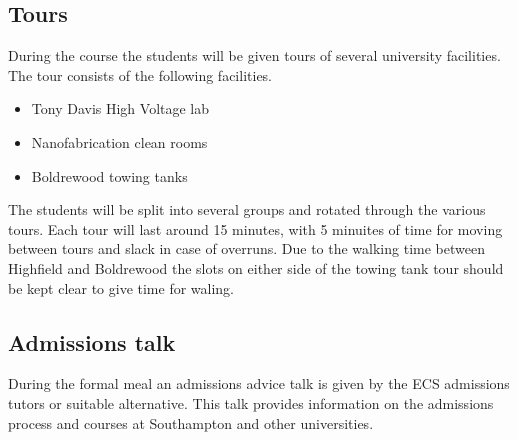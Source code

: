 
\subsection{Tours}

During the course the students will be given tours of several university facilities.
The tour consists of the following facilities.

\begin{itemize}
    \item Tony Davis High Voltage lab
    \item Nanofabrication clean rooms
    \item Boldrewood towing tanks
\end{itemize}

The students will be split into several groups and rotated through the various tours.
Each tour will last around 15 minutes, with 5 minuites of time for moving between tours and slack in case of overruns.
Due to the walking time between Highfield and Boldrewood the slots on either side of the towing tank tour should be kept clear to give time for waling.


\subsection{Admissions talk}

During the formal meal an admissions advice talk is given by the ECS admissions tutors or suitable alternative.
This talk provides information on the admissions process and courses at Southampton and other universities.


